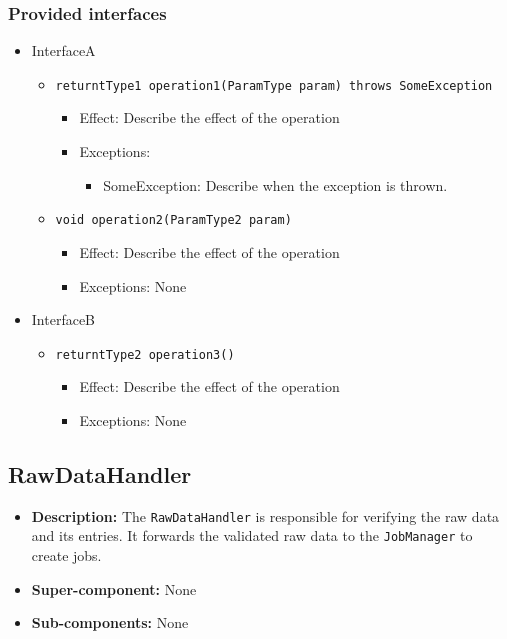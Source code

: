 \documentclass[a4paper,10pt]{article}
\begin{document}
\subsubsection*{Provided interfaces}
\begin{itemize}
    \item InterfaceA
    \begin{itemize}
        \item \texttt{returntType1 operation1(ParamType param) throws SomeException}
        \begin{itemize}
            \item Effect: Describe the effect of the operation
            \item Exceptions:
            \begin{itemize}
                \item SomeException: Describe when the exception is thrown.
            \end{itemize}
		\end{itemize}
        \item \texttt{void operation2(ParamType2 param)}
        \begin{itemize}
            \item Effect: Describe the effect of the operation
            \item Exceptions: None
        \end{itemize}
    \end{itemize}

    \item InterfaceB
    \begin{itemize}
        \item \texttt{returntType2 operation3()}
        \begin{itemize}
            \item Effect: Describe the effect of the operation
            \item Exceptions: None
        \end{itemize}
    \end{itemize}
\end{itemize}

\subsection{RawDataHandler}
\begin{itemize}
    \item \textbf{Description:} The \texttt{RawDataHandler} is responsible for verifying the raw data and its entries. It forwards the validated raw data to the \texttt{JobManager} to create jobs.
    \item \textbf{Super-component:} None
    \item \textbf{Sub-components:} None
\end{itemize}
\end{document}
